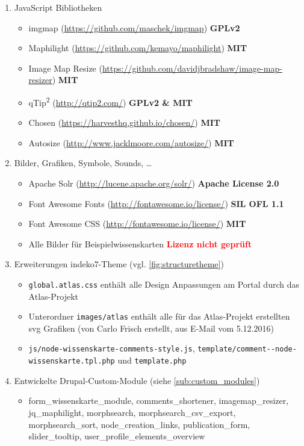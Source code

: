 \begin{enumerate}
	\item JavaScript Bibliotheken
	\begin{itemize}
		\item imgmap (\url{https://github.com/maschek/imgmap})  \textbf{GPLv2}
		\item Maphilight (\url{https://github.com/kemayo/maphilight}) \textbf{MIT}
		\item Image Map Resize (\url{https://github.com/davidjbradshaw/image-map-resizer}) \textbf{MIT}
		\item qTip\textsuperscript{2} (\url{http://qtip2.com/}) \textbf{GPLv2 \& MIT}
		\item Chosen (\url{https://harvesthq.github.io/chosen/}) \textbf{MIT}
		\item Autosize (\url{http://www.jacklmoore.com/autosize/}) \textbf{MIT}
	\end{itemize}

	\item Bilder, Grafiken, Symbole, Sounds, \dots\label{sub:license_images}
	\begin{itemize}
		\item Apache Solr (\url{http://lucene.apache.org/solr/}) \textbf{Apache License 2.0}
		\item Font Awesome Fonts (\url{http://fontawesome.io/license/}) \textbf{SIL OFL 1.1}
		\item Font Awesome CSS (\url{http://fontawesome.io/license/}) \textbf{MIT}
		\item Alle Bilder für Beispielwissenskarten \textcolor{red}{\textbf{Lizenz nicht geprüft}}		
	\end{itemize} 

	\item Erweiterungen indeko7-Theme (vgl. \cref{fig:structuretheme})
	\begin{itemize}
		\item \lstinline|global.atlas.css| enthält alle Design Anpassungen am Portal durch das Atlas-Projekt
		\item Unterordner \lstinline|images/atlas| enthält alle für das Atlas-Projekt erstellten svg Grafiken (von Carlo Frisch erstellt, aus E-Mail vom 5.12.2016)
		\item \lstinline|js/node-wissenskarte-comments-style.js|, \lstinline|template/comment--node-wissenskarte.tpl.php| und \lstinline|template.php|
	\end{itemize}

	\item Entwickelte Drupal-Custom-Module (siehe \cref{sub:custom_modules})
	\begin{itemize}
		\item form\_wissenskarte\_module, comments\_shortener, imagemap\_resizer, jq\_maphilight, morphsearch, morphsearch\_csv\_export, morphsearch\_sort, node\_creation\_links, publication\_form, slider\_tooltip, user\_profile\_elements\_overview
	\end{itemize}
\end{enumerate}



